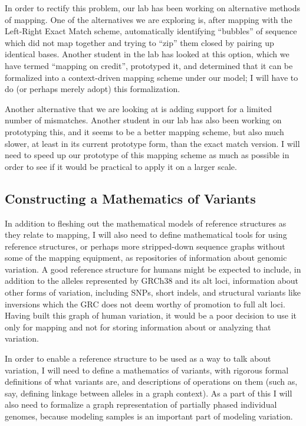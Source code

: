 \documentclass[11pt,proposal]{ucthesis}
\begin{document}
In order to rectify this problem, our lab has been working on alternative methods of mapping. One of the alternatives we are exploring is, after mapping with the Left-Right Exact Match scheme, automatically identifying ``bubbles'' of sequence which did not map together and trying to ``zip'' them closed by pairing up identical bases. Another student in the lab has looked at this option, which we have termed ``mapping on credit'', prototyped it, and determined that it can be formalized into a context-driven mapping scheme under our model; I will have to do (or perhaps merely adopt) this formalization.

Another alternative that we are looking at is adding support for a limited number of mismatches. Another student in our lab has also been working on prototyping this, and it seems to be a better mapping scheme, but also much slower, at least in its current prototype form, than the exact match version. I will need to speed up our prototype of this mapping scheme as much as possible in order to see if it would be practical to apply it on a larger scale.

\subsection{Constructing a Mathematics of Variants}

In addition to fleshing out the mathematical models of reference structures as they relate to mapping, I will also need to define mathematical tools for using reference structures, or perhaps more stripped-down sequence graphs without some of the mapping equipment, as repositories of information about genomic variation. A good reference structure for humans might be expected to include, in addition to the alleles represented by GRCh38 and its alt loci, information about other forms of variation, including SNPs, short indels, and structural variants like inversions which the GRC does not deem worthy of promotion to full alt loci. Having built this graph of human variation, it would be a poor decision to use it only for mapping and not for storing information about or analyzing that variation.

In order to enable a reference structure to be used as a way to talk about variation, I will need to define a mathematics of variants, with rigorous formal definitions of what variants are, and descriptions of operations on them (such as, say, defining linkage between alleles in a graph context). As a part of this I will also need to formalize a graph representation of partially phased individual genomes, because modeling samples is an important part of modeling variation.
\end{document}
